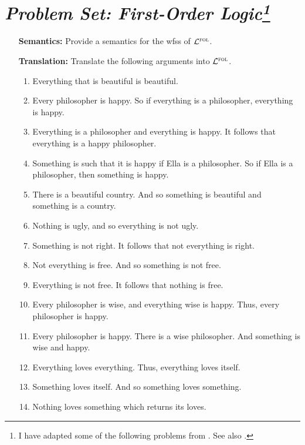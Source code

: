 \documentclass[a4paper, 11pt]{article} %
\begin{document}
\section*{\it Problem Set: First-Order Logic\footnote{I have adapted some of the following problems from \citet{Carr2013}. See also \citet{Halbach2010}.}}

\begin{enumerate}[leftmargin=1.2in,labelsep=.15in] 
\item[\bf Semantics:] Provide a semantics for the wfss of $\mathcal{L}^{\textsc{fol}}$.
\item[\bf Translation:] Translate the following arguments into $\mathcal{L}^{\textsc{fol}}$.
	\begin{enumerate}[label=(\arabic*)]\small
	\item Everything that is beautiful is beautiful.
	\item Every philosopher is happy. So if everything is a philosopher, everything is happy.
	\item Everything is a philosopher and everything is happy. It follows that everything is a happy philosopher.
	\item Something is such that it is happy if Ella is a philosopher. So if Ella is a philosopher, then something is happy. 
	\item There is a beautiful country. And so something is beautiful and something is a country.
	\item Nothing is ugly, and so everything is not ugly.
	\item Something is not right. It follows that not everything is right.
	\item Not everything is free. And so something is not free.
	\item Everything is not free. It follows that nothing is free.
	\item Every philosopher is wise, and everything wise is happy. Thus, every philosopher is happy.
	\item Every philosopher is happy. There is a wise philosopher. And something is wise and happy.
	\item Everything loves everything. Thus, everything loves itself.
	\item Something loves itself. And so something loves something.
	\item Nothing loves something which returns its loves.

\end{enumerate}
\end{enumerate}
\end{document}
